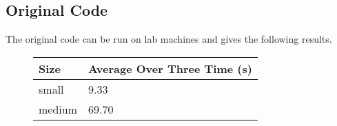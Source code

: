 \subsection*{Original Code}
The original code can be run on lab machines and gives the following results.\\
\begin{figure}[H]\centering \begin{tabular}{ l | l }
  \hline
  Size & Average Over Three Time (s) \\
  \hline
  \hline
  small & 9.33 \\
  medium & 69.70 \\
  \hline
\end{tabular} \end{figure}
